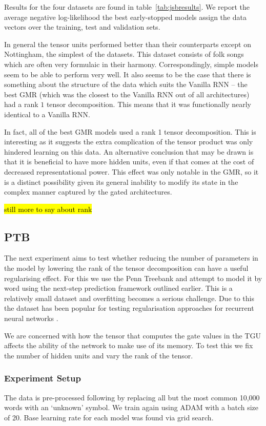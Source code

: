 Results for the four datasets are found in table~\ref{tab:jsbresults}. We report the average
negative log-likelihood the best early-stopped models assign the data vectors over
the training, test and validation sets.

In general the tensor units performed better than their counterparts except on
Nottingham, the simplest of the datasets. This dataset consists of folk songs which
are often very formulaic in their harmony. Correspondingly, simple models seem to be able to
perform very well. It also seems to be the case that there is something about the structure
of the data which suits the Vanilla RNN -- the best GMR (which was the closest to the
Vanilla RNN out of all architectures) had a rank \(1\) tensor decomposition. This means
that it was functionally nearly identical to a Vanilla RNN.

In fact, all of the best GMR models used a rank 1 tensor decomposition. This is interesting
as it suggests the extra complication of the tensor product was only hindered learning on
this data. An alternative conclusion that may be drawn is that it is beneficial to have more
hidden units, even if that comes at the cost of decreased representational power. This effect
was only notable in the GMR, so it is a distinct possibility given its general inability
to modify its state in the complex manner captured by the gated architectures.

\hl{still more to say about rank}

\subsection{PTB}
The next experiment aims to test whether reducing the number of parameters in the model by lowering
the rank of the tensor decomposition can have a useful regularising effect. For this we use the
Penn Treebank \autocite{Marcus1993} and attempt to model it by word using the next-step prediction
framework outlined earlier. This is a relatively small dataset and overfitting becomes a serious
challenge. Due to this the dataset has been popular for testing regularisation approaches for
recurrent neural networks \autocite{Zaremba2014, Gal2015}.

We are concerned with how the tensor that computes the gate values in the TGU affects the ability of
the network to make use of its memory. To test this we fix the number of hidden units and vary the
rank of the tensor.

\subsubsection{Experiment Setup}
The data is pre-processed following \autocite{Zaremba2014} by replacing all but the most common
10,000 words with an `unknown' symbol. We train again using ADAM with a batch size of 20. Base learning
rate for each model was found via grid search.

